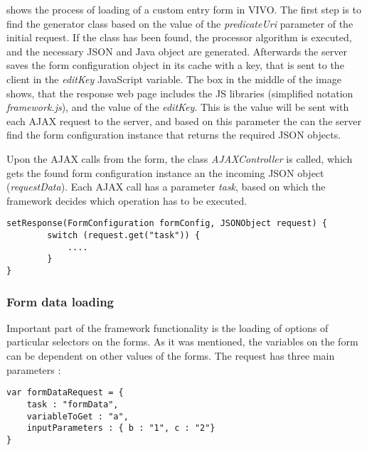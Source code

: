 

 shows the process of loading of a custom entry form in VIVO. The first step is to find the generator class based on the value of the \textit{predicateUri} parameter of the initial request. If the class has been found, the processor algorithm is executed, and the necessary JSON and Java object are generated. Afterwards the server saves the form configuration object in its cache with a key, that is sent to the client in the \textit{editKey} JavaScript variable. The box in the middle of the image shows, that the response web page includes the JS libraries (simplified notation \textit{framework.js}), and the value of the \textit{editKey}. This is the value will be sent with each AJAX request to the server, and based on this parameter the can the server find the form configuration instance that returns the required JSON objects.


Upon the AJAX calls from the form, the class \textit{AJAXController} is called, which gets the found form configuration instance an the incoming JSON object (\textit{requestData}). Each AJAX call has a parameter \textit{task}, based on which the framework decides which operation has to be executed.

\begin{lstlisting}[basicstyle=\footnotesize, frame=single, caption={AJAX request server routine}, label=serveRequest, captionpos=b, belowskip=1em, aboveskip=2em]
setResponse(FormConfiguration formConfig, JSONObject request) {
		switch (request.get("task")) {
			....
		}
}
\end{lstlisting}

\subsubsection{Form data loading}

Important part of the framework functionality is the loading of options of particular selectors on the forms. As it was mentioned, the variables on the form can be dependent on other values of the forms. The request has three main parameters :

\begin{lstlisting}[basicstyle=\footnotesize, frame=single, caption={Example request data for form data}, label=serveRequest, captionpos=b, belowskip=1em, aboveskip=2em]
var formDataRequest = {
	task : "formData",
	variableToGet : "a",
	inputParameters : { b : "1", c : "2"} 
}
\end{lstlisting}

